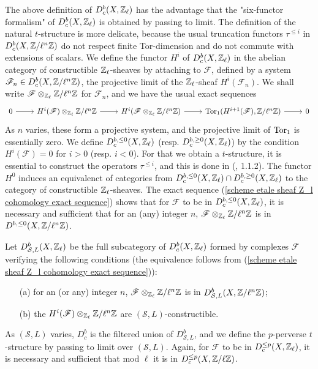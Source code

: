 The above definition of $D^b_c(X,\mathbb{Z}_\ell)$ has the advantage that the "six-functor formalism" of $D^b_c(X,\mathbb{Z}_\ell)$ is obtained by passing to limit. The definition of the natural $t$-structure is more delicate, because the usual truncation functors $\tau^{\leq i}$ in $D^b_c(X,\mathbb{Z}/\ell^n\mathbb{Z})$ do not respect finite Tor-dimension and do not commute with extensions of scalars. We define the functor $H^i$ of $D^b_c(X,\mathbb{Z}_\ell)$ in the abelian category of constructible $\mathbb{Z}_\ell$-sheaves by attaching to $\mathscr{F}$, defined by a system $\mathscr{F}_n\in D^b_c(X,\mathbb{Z}/\ell^n\mathbb{Z})$, the projective limit of the $\mathbb{Z}_\ell$-sheaf $H^i(\mathscr{F}_n)$. We shall write $\mathscr{F}\otimes_{\mathbb{Z}_\ell}\mathbb{Z}/\ell^n\mathbb{Z}$ for $\mathscr{F}_n$, and we have the usual exact sequences
\begin{equation}\label{scheme etale sheaf Z_l  cohomology exact sequence}
\begin{tikzcd}
0\ar[r]&H^i(\mathscr{F})\otimes_{\Z_\ell}\Z/\ell^n\Z\ar[r]&H^i(\mathscr{F}\otimes_{\Z_\ell}\Z/\ell^n\Z)\ar[r]&\Tor_1(H^{i+1}(\mathscr{F}),\Z/\ell^n\Z)\ar[r]&0
\end{tikzcd}
\end{equation}
As $n$ varies, these form a projective system, and the projective limit of $\mathrm{Tor}_1$ is essentially zero. We define $D^{b,\leq 0}_c(X,\mathbb{Z}_\ell)$ (resp. $D^{b,\geq 0}_c(X,\mathbb{Z}_\ell)$) by the condition $H^i(\mathscr{F})=0$ for $i>0$ (resp. $i<0$). For that we obtain a $t$-structure, it is essential to construct the operators $\tau^{\leq i}$, and this is done in (\cite{A}, 1.1.2). The functor $H^0$ induces an equivalenct of categories from $D^{b,\leq 0}_c(X,\mathbb{Z}_\ell)\cap D^{b,\geq 0}_c(X,\mathbb{Z}_\ell)$ to the category of constructible $\mathbb{Z}_\ell$-sheaves. The exact sequence (\ref{scheme etale sheaf Z_l  cohomology exact sequence}) shows that for $\mathscr{F}$ to be in $D^{b,\leq 0}_c(X,\mathbb{Z}_\ell)$, it is necessary and sufficient that for an (any) integer $n$, $\mathscr{F}\otimes_{\mathbb{Z}_\ell}\mathbb{Z}/\ell^n\mathbb{Z}$ is in $D^{b,\leq 0}(X,\mathbb{Z}/\ell^n\mathbb{Z})$.\par

Let $D^b_{\mathcal{S},L}(X,\mathbb{Z}_\ell)$ be the full subcategory of $D^b_c(X,\mathbb{Z}_\ell)$ formed by complexes $\mathscr{F}$ verifying the following conditions (the equivalence follows from (\ref{scheme etale sheaf Z_l  cohomology exact sequence})):
\begin{enumerate}
    \item[(a)] for an (or any) integer $n$, $\mathscr{F}\otimes_{\mathbb{Z}_\ell}\mathbb{Z}/\ell^n\mathbb{Z}$ is in $D^b_{\mathcal{S},L}(X,\mathbb{Z}/\ell^n\mathbb{Z})$;
    \item[(b)] the $H^i(\mathscr{F})\otimes_{\mathbb{Z}_\ell}\mathbb{Z}/\ell^n\mathbb{Z}$ are $(\mathcal{S},L)$-constructible. 
\end{enumerate}
As $(\mathcal{S},L)$ varies, $D^b_c$ is the filtered union of $D_{\mathcal{S},L}^b$, and we define the $p$-perverse $t$-structure by passing to limit over $(\mathcal{S},L)$. Again, for $\mathscr{F}$ to be in $D_c^{\leq p}(X,\mathbb{Z}_\ell)$, it is necessary and sufficient that mod $\ell$ it is in $D_c^{\leq p}(X,\mathbb{Z}/\ell\mathbb{Z})$.\par

